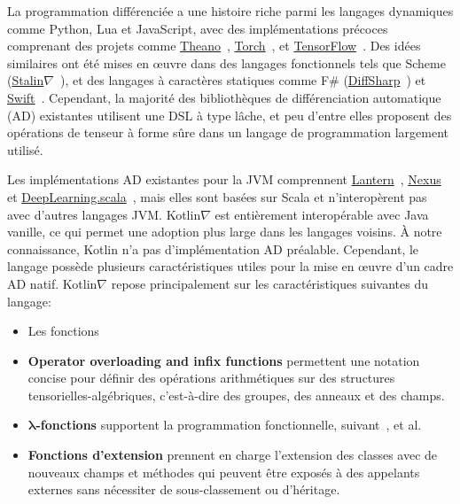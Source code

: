 La programmation différenciée a une histoire riche parmi les langages dynamiques comme Python, Lua et JavaScript, avec des implémentations précoces comprenant des projets comme \href{http://deeplearning.net/software/theano/}{Theano}~\citep{bergstra2010theano}, \href{http://torch.ch/}{Torch}~\citep{collobert2002torch}, et \href{https://tensorflow.org/}{TensorFlow}~\citep{abadi2016tensorflow}. Des idées similaires ont été mises en œuvre dans des langages fonctionnels tels que Scheme (\href{https://github.com/Functional-AutoDiff/STALINGRAD}{Stalin$\nabla$}~\citep{pearlmutter2008using}), et des langages à caractères statiques comme F\# (\href{https://diffsharp.github.io/DiffSharp/}{DiffSharp}~\citep{baydin2015diffsharp}) et \href{https://www.tensorflow.org/swift}{Swift}~\citep{lattner2018tensorflow}. Cependant, la majorité des bibliothèques de différenciation automatique (AD) existantes utilisent une DSL à type lâche, et peu d'entre elles proposent des opérations de tenseur à forme sûre dans un langage de programmation largement utilisé.

Les implémentations AD existantes pour la JVM comprennent \href{https://feiwang3311.github.io/Lantern/}{Lantern}~\citep{wang2018demystifying}, \href{https://tongfei.me/nexus/}{Nexus}~\citep{chen2017typesafe} et \href{https://github.com/ThoughtWorksInc/DeepLearning.scala}{DeepLearning.scala}~\citep{yang2018dl4s}, mais elles sont basées sur Scala et n'interopèrent pas avec d'autres langages JVM. Kotlin$\nabla$ est entièrement interopérable avec Java vanille, ce qui permet une adoption plus large dans les langages voisins. À notre connaissance, Kotlin n'a pas d'implémentation AD préalable. Cependant, le langage possède plusieurs caractéristiques utiles pour la mise en œuvre d'un cadre AD natif. Kotlin$\nabla$ repose principalement sur les caractéristiques suivantes du langage:

\begin{itemize}
    \item Les fonctions \item \textbf{Operator overloading and infix functions} permettent une notation concise pour définir des opérations arithmétiques sur des structures tensorielles-algébriques, c'est-à-dire des groupes, des anneaux et des champs.
    \item \textbf{$\mathbf{\lambda}$-fonctions} supportent la programmation fonctionnelle, suivant~\citet{pearlmutter2008reverse, pearlmutter2008using, siskind2008nesting, elliott2009beautiful, elliott2018simple}, et al.
    \item \textbf{Fonctions d'extension} prennent en charge l'extension des classes avec de nouveaux champs et méthodes qui peuvent être exposés à des appelants externes sans nécessiter de sous-classement ou d'héritage.
\end{itemize}

